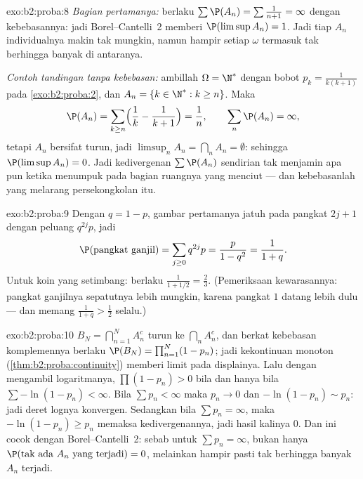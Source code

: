\begin{solution}{exo:b2:proba:8}
\emph{Bagian pertamanya:} berlaku $\sum \P(A_n) = \sum\frac{1}{n+1} = \infty$
dengan kebebasannya: jadi Borel--Cantelli~2 memberi $\P(\limsup A_n) = 1$.
Jadi tiap $A_n$ individualnya makin tak mungkin, namun hampir setiap
$\omega$ termasuk tak berhingga banyak di antaranya.

\emph{Contoh tandingan tanpa kebebasan:} ambillah $\Omega = \N^*$
dengan bobot $p_k = \frac{1}{k(k+1)}$ pada
\cref{exo:b2:proba:2}, dan $A_n = \{k \in \N^* : k \geq n\}$.
Maka
\[
\P(A_n) = \sum_{k \geq n}\Bigl(\frac1k - \frac1{k+1}\Bigr)
= \frac1n ,
\qquad
\sum_n \P(A_n) = \infty ,
\]
tetapi $A_n$ bersifat turun, jadi $\limsup_n A_n = \bigcap_n A_n =
\emptyset$: sehingga $\P(\limsup A_n) = 0$. Jadi kedivergenan $\sum\P(A_n)$
sendirian tak menjamin apa pun ketika  menumpuk pada bagian
ruangnya yang menciut --- dan kebebasanlah yang melarang
persekongkolan itu.
\end{solution}

\begin{solution}{exo:b2:proba:9}
Dengan $q = 1 - p$, gambar pertamanya jatuh pada pangkat $2j + 1$ dengan
peluang $q^{2j}p$, jadi
\[
\P(\text{pangkat ganjil}) = \sum_{j\geq0}q^{2j}p
= \frac{p}{1 - q^2} = \frac{1}{1 + q} .
\]
Untuk koin yang setimbang: berlaku $\frac1{1 + 1/2} = \frac23$. (Pemeriksaan kewarasannya:
pangkat ganjilnya sepatutnya lebih mungkin, karena pangkat $1$ datang lebih dulu ---
dan memang $\frac1{1+q} > \frac12$ selalu.)
\end{solution}

\begin{solution}{exo:b2:proba:10}
 $B_N = \bigcap_{n=1}^N A_n^c$ turun ke
$\bigcap_nA_n^c$, dan berkat kebebasan komplemennya
berlaku $\P(B_N) = \prod_{n=1}^N(1 - p_n)$; jadi kekontinuan monoton
(\cref{thm:b2:proba:continuity}) memberi limit pada displainya.
Lalu dengan mengambil logaritmanya, $\prod(1 - p_n) > 0$ bila dan hanya bila $\sum-\ln(1 -
p_n) < \infty$. Bila $\sum p_n < \infty$ maka $p_n \to 0$ dan
$-\ln(1 - p_n) \sim p_n$: jadi deret lognya konvergen. Sedangkan bila
$\sum p_n = \infty$, maka $-\ln(1 - p_n) \geq p_n$ memaksa
kedivergenannya, jadi hasil kalinya $0$. Dan ini cocok dengan
Borel--Cantelli~2: sebab untuk $\sum p_n = \infty$, bukan hanya
$\P(\text{tak ada }A_n\text{ yang terjadi}) = 0$, melainkan hampir pasti
tak berhingga banyak $A_n$ terjadi.
\end{solution}


